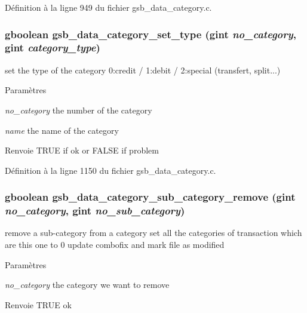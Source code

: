 Définition à la ligne 949 du fichier gsb\_\-data\_\-category.c.

\subsubsection[{gsb\_\-data\_\-category\_\-set\_\-type}]{\setlength{\rightskip}{0pt plus 5cm}gboolean gsb\_\-data\_\-category\_\-set\_\-type (gint {\em no\_\-category}, \/  gint {\em category\_\-type})}\label{gsb__data__category_8h_a5378b0ca829c745cd3cd2b8c11d090fd}
set the type of the category 0:credit / 1:debit / 2:special (transfert, split...)


\begin{DoxyParams}{Paramètres}
\item[{\em no\_\-category}]the number of the category \item[{\em name}]the name of the category\end{DoxyParams}
\begin{DoxyReturn}{Renvoie}
TRUE if ok or FALSE if problem 
\end{DoxyReturn}


Définition à la ligne 1150 du fichier gsb\_\-data\_\-category.c.

\subsubsection[{gsb\_\-data\_\-category\_\-sub\_\-category\_\-remove}]{\setlength{\rightskip}{0pt plus 5cm}gboolean gsb\_\-data\_\-category\_\-sub\_\-category\_\-remove (gint {\em no\_\-category}, \/  gint {\em no\_\-sub\_\-category})}\label{gsb__data__category_8h_a46cf96dd8292ede898029509cd912c13}
remove a sub-\/category from a category set all the categories of transaction which are this one to 0 update combofix and mark file as modified


\begin{DoxyParams}{Paramètres}
\item[{\em no\_\-category}]the category we want to remove\end{DoxyParams}
\begin{DoxyReturn}{Renvoie}
TRUE ok 
\end{DoxyReturn}


